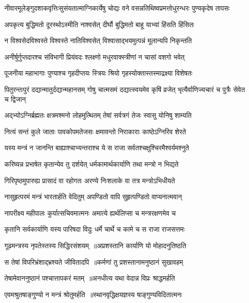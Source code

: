 \twolineshloka
{नीवारमूलेङ्गुदशाकवृत्तिःसुसंयतात्माग्निकार्येषु चोद्यः}
{वने वसन्नतिथिष्वप्रमत्तोधुरन्धरः पुण्यकृदेष तापसः}


\twolineshloka
{अपकृत्य बुद्धिमतो दूरस्थोऽस्मीति नाश्वसेत्}
{दीर्घौ बुद्धिमतो बाहू याभ्यां हिंसति हिंसितः}


\twolineshloka
{न विश्वसेदविश्वस्ते विश्वस्ते नातिविश्वसेत्}
{विश्वासाद्भयमुत्पन्नं मूलान्यपि निकृन्तति}


\twolineshloka
{अनीर्षुर्गुप्तदारश्च संविभागी प्रियंवदः}
{श्लक्ष्णो मधुरवाक्स्त्रीणां न चासां वशगो भवेत्}


\twolineshloka
{पूजनीया महाभागाः पुण्याश्च गृहदीप्तयः}
{स्त्रियः श्रियो गृहस्योक्तास्तस्माद्रक्ष्या विशेषतः}


\threelineshloka
{पितुरन्तःपुरं दद्यान्मातुर्दद्यान्महानसम्}
{गोषु चात्मसमं दद्यात्स्वयमेव कृषिं व्रजेत्}
{भृत्यैर्वाणिज्यचारं च पुत्रैः सेवेत च द्विजान्}


\twolineshloka
{अद्भ्योऽग्निर्ब्रह्मतः क्षत्रमश्मनो लोहमुत्थितम्}
{तेषां सर्वत्रगं तेजः स्वासु योनिषु शाम्यति}


\twolineshloka
{नित्यं सन्तं कुले जाताः पावकोपमतेजसः}
{क्षमावन्तो निराकाराः काष्ठेऽग्निरिव शेरते}


\twolineshloka
{यस्य मन्त्रं न जानन्ति बाह्याश्चाभ्यन्तराश्च ये}
{स राजा सर्वतश्चक्षुश्चिरमैश्वर्यमश्नुते}


\twolineshloka
{करिष्यन्न प्रभाषेत कृतान्येव तु दर्शयेत्}
{धर्मकामार्थकार्याणि तथा मन्त्रो न भिद्यते}


\twolineshloka
{गिरिपृष्ठमुपारुह्य प्रासादं वा रहोगतः}
{अरण्ये निःशलाके वा तत्र मन्त्रोऽभिधीयते}


\twolineshloka
{नासुहृत्परमं मन्त्रं भारतार्हति वेदितुम्}
{अपण्डितो वापि सुहृत्पण्डितो वाप्यनात्मवान्}


\twolineshloka
{नापरीक्ष्य महीपालः कुर्यात्सचिवमात्मनः}
{अमात्ये ह्यर्थलिप्सा च मन्त्ररक्षणमेव च}


\threelineshloka
{कृतानि सर्वकार्याणि यस्य पारिषदा विदुः}
{धर्मे चार्थे च कामे च स राजा राजसत्तमः}
{}


\twolineshloka
{गूढमन्त्रस्य नृपतेस्तस्य सिद्धिरसंशयम् ॥अप्रशस्तानि कार्याणि यो मोहादनुतिष्ठति}
{}


\twolineshloka
{स तेषां विपरिभ्रंशाद्भ्रश्यते जीवितादपि ॥कर्मणां तु प्रशस्तानामनुष्ठानं सुखावहम्}
{}


\twolineshloka
{तेषामेवाननुष्ठानं पश्चात्तापकरं मतम् ॥अनधीत्य यथा वेदान्न विप्रः श्राद्धमर्हति}
{}


\twolineshloka
{एवमश्रुतषाङ्गुण्यो न मन्त्रं श्रोतुमर्हति ॥स्थानवृद्धिक्षयज्ञस्य षाङ्गुण्यविदितात्मनः}
{}


